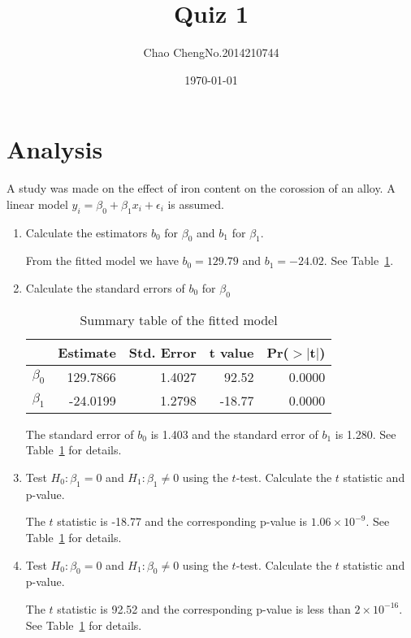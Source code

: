 \documentclass[a4paper,12pt]{article}
\title{Quiz 1}
\author{Chao Cheng\quad No.2014210744 }
\date{\today}
\begin{document}
\maketitle

\section*{Analysis}

A study was made on the effect of iron content on the corossion of an alloy.
A linear model $y_i=\beta_0+\beta_1 x_i +\epsilon_i$ is assumed.

\begin{enumerate}
\item Calculate the estimators $b_0$ for $\beta_0$ and $b_1$ for $\beta_1$.
\par
From the fitted model we have $b_0=129.79$ and $b_1=-24.02$. See Table~\ref{tab:summary}.
\par

\item Calculate the standard errors of $b_0$ for $\beta_0$
\par
\begin{table}[htbp]
  \centering
  \begin{tabular}{rrrrr}
  \hline
 & Estimate & Std. Error & t value & Pr($>$$|$t$|$) \\ 
  \hline
$\beta_0$ & 129.7866 & 1.4027 & 92.52 & 0.0000 \\ 
 $\beta_1$ & -24.0199 & 1.2798 & -18.77 & 0.0000 \\ 
   \hline
\end{tabular}
  \caption{Summary table of the fitted model}
  \label{tab:summary}
\end{table}
\par
The standard error of $b_0$ is 1.403 and the standard error of $b_1$ is 1.280. See Table~\ref{tab:summary} for details.
\par



\item Test $H_0:\beta_1=0$ and $H_1:\beta_1\neq 0$ using the $t$-test.
Calculate the $t$ statistic and p-value.
\par
The $t$ statistic is -18.77 and the corresponding p-value is $1.06\times 10^{-9}$. See Table~\ref{tab:summary} for details.
\par



\item Test $H_0:\beta_0=0$ and $H_1:\beta_0\neq 0$ using the $t$-test.
Calculate the $t$ statistic and p-value.
\par
The $t$ statistic is 92.52 and the corresponding p-value is less than $2\times 10^{-16}$. See Table~\ref{tab:summary} for details.
\par





\end{enumerate}
\end{document}
